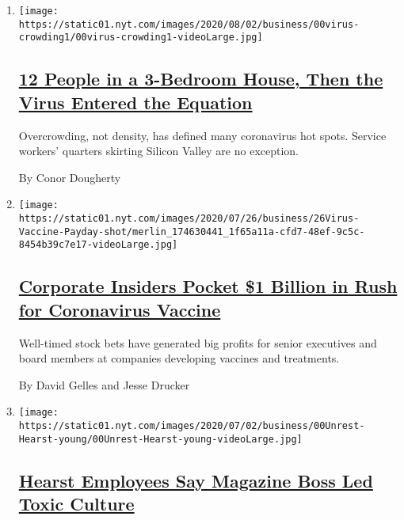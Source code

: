 \begin{enumerate}
\def\labelenumi{\arabic{enumi}.}
\item
  \texttt{[image: https://static01.nyt.com/images/2020/08/02/business/00virus-crowding1/00virus-crowding1-videoLarge.jpg]}

  \hypertarget{12-people-in-a-3-bedroom-house-then-the-virus-entered-the-equation}{%
  \subsection{\texorpdfstring{\href{/2020/08/01/business/economy/housing-overcrowding-coronavirus.html}{12
  People in a 3-Bedroom House, Then the Virus Entered the
  Equation}}{12 People in a 3-Bedroom House, Then the Virus Entered the Equation}}\label{12-people-in-a-3-bedroom-house-then-the-virus-entered-the-equation}}

  Overcrowding, not density, has defined many coronavirus hot spots.
  Service workers' quarters skirting Silicon Valley are no exception.

  By Conor Dougherty
\item
  \texttt{[image: https://static01.nyt.com/images/2020/07/26/business/26Virus-Vaccine-Payday-shot/merlin\_174630441\_1f65a11a-cfd7-48ef-9c5c-8454b39c7e17-videoLarge.jpg]}

  \hypertarget{corporate-insiders-pocket-1-billion-in-rush-for-coronavirus-vaccine}{%
  \subsection{\texorpdfstring{\href{/2020/07/25/business/coronavirus-vaccine-profits-vaxart.html}{Corporate
  Insiders Pocket \$1 Billion in Rush for Coronavirus
  Vaccine}}{Corporate Insiders Pocket \$1 Billion in Rush for Coronavirus Vaccine}}\label{corporate-insiders-pocket-1-billion-in-rush-for-coronavirus-vaccine}}

  Well-timed stock bets have generated big profits for senior executives
  and board members at companies developing vaccines and treatments.

  By David Gelles and Jesse Drucker
\item
  \texttt{[image: https://static01.nyt.com/images/2020/07/02/business/00Unrest-Hearst-young/00Unrest-Hearst-young-videoLarge.jpg]}

  \hypertarget{hearst-employees-say-magazine-boss-led-toxic-culture}{%
  \subsection{\texorpdfstring{\href{/2020/07/22/business/media/hearst-harassment-troy-young.html}{Hearst
  Employees Say Magazine Boss Led Toxic
  Culture}}{Hearst Employees Say Magazine Boss Led Toxic Culture}}\label{hearst-employees-say-magazine-boss-led-toxic-culture}}


\end{enumerate}
